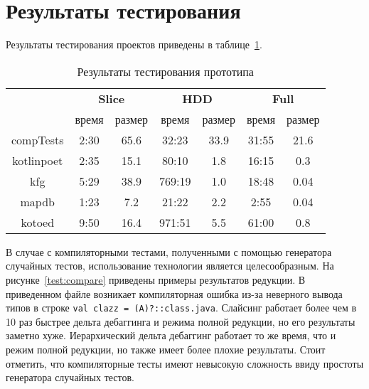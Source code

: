\section{Результаты тестирования}
Результаты тестирования проектов приведены в таблице~\ref{tab:testing}.
%
\begin{table}[]
\center
\captionsetup{skip=5pt}
\caption{\label{tab:testing}Результаты тестирования прототипа}
\begin{tabular}{| c | c | c | c | c | c | c |}
\hline
\bf \multirow{2}{*}{Проект} & \multicolumn{2}{|c|}{\bf Slice} & \multicolumn{2}{|c|}{\bf HDD} & \multicolumn{2}{|c|}{\bf Full} \\
\cline{2-7}
& время & размер & время & размер & время & размер \\
\hline
compTests & 2:30 & 65.6 & 32:23 & 33.9 & 31:55 & 21.6 \\
\hline
kotlinpoet & 2:35 & 15.1 & 80:10 & 1.8 & 16:15 & 0.3 \\
\hline
kfg & 5:29 & 38.9 & 769:19 & 1.0 & 18:48 & 0.04 \\
\hline
mapdb & 1:23 & 7.2 & 21:22 & 2.2 & 2:55 & 0.04 \\
\hline
kotoed & 9:50 & 16.4 & 971:51 & 5.5 & 61:00 & 0.8 \\
\hline
\end{tabular}
\end{table}
%
В случае с компиляторными тестами, полученными с помощью генератора случайных тестов, использование технологии является целесообразным. На рисунке~\ref{test:compare} приведены примеры результатов редукции. В приведенном файле возникает компиляторная ошибка из-за неверного вывода типов в строке \texttt{val clazz = (A)?::class.java}. Слайсинг работает более чем в 10 раз быстрее дельта дебаггинга и режима полной редукции, но его результаты заметно хуже. Иерархический дельта дебаггинг работает то же время, что и режим полной редукции, но также имеет более плохие результаты. Стоит отметить, что компиляторные тесты имеют невысокую сложность ввиду простоты генератора случайных тестов. 

